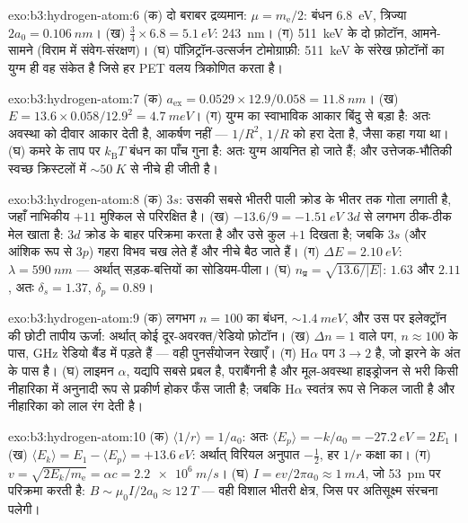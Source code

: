 \begin{solution}{exo:b3:hydrogen-atom:6}
(क) दो बराबर द्रव्यमान: $\mu = m_{\text{e}}/2$: बंधन
\qty{6.8}{eV}, त्रिज्या $2a_0 = \qty{0.106}{nm}$। (ख) $\tfrac34
\times 6.8 = \qty{5.1}{eV}$: \qty{243}{nm}। (ग) \qty{511}{keV} के दो
फ़ोटॉन, आमने-सामने (विराम में संवेग-संरक्षण)। (घ)
पॉज़िट्रॉन-उत्सर्जन टोमोग्राफ़ी: \qty{511}{keV} के संरेख फ़ोटॉनों का
युग्म ही वह संकेत है जिसे हर PET वलय त्रिकोणित करता है।
\end{solution}

\begin{solution}{exo:b3:hydrogen-atom:7}
(क) $a_{\text{ex}} = 0.0529 \times 12.9/0.058 = \qty{11.8}{nm}$।
(ख) $E = 13.6 \times 0.058/12.9^2 = \qty{4.7}{meV}$। (ग)
युग्म का स्वाभाविक आकार बिंदु से बड़ा है: अतः अवस्था को दीवार आकार
देती है, आकर्षण नहीं --- $1/R^2$, $1/R$ को हरा देता है, जैसा कहा गया था। (घ)
कमरे के ताप पर $k_{\text{B}}T$ बंधन का पाँच गुना है: अतः
युग्म आयनित हो जाते हैं; और उत्तेजक-भौतिकी स्वच्छ क्रिस्टलों में
$\sim\qty{50}{K}$ से नीचे ही जीती है।
\end{solution}

\begin{solution}{exo:b3:hydrogen-atom:8}
(क) $3s$: उसकी सबसे भीतरी पाली क्रोड के भीतर तक गोता लगाती है, जहाँ
नाभिकीय $+11$ मुश्किल से परिरक्षित है। (ख) $-13.6/9 = \qty{-1.51}{eV}$
$3d$ से लगभग ठीक-ठीक मेल खाता है: $3d$ क्रोड के बाहर परिक्रमा करता है
और उसे कुल $+1$ दिखता है; जबकि $3s$ (और आंशिक रूप से $3p$) गहरा विभव
चख लेते हैं और नीचे बैठ जाते हैं। (ग) $\Delta E = \qty{2.10}{eV}$: $\lambda = \qty{590}{nm}$
--- अर्थात् सड़क-बत्तियों का सोडियम-पीला। (घ) $n_{\text{प्र}} =
\sqrt{13.6/|E|}$: $1.63$ और $2.11$, अतः $\delta_s = 1.37$,
$\delta_p = 0.89$।
\end{solution}

\begin{solution}{exo:b3:hydrogen-atom:9}
(क) लगभग $n = 100$ का बंधन, $\sim\qty{1.4}{meV}$, और उस पर
इलेक्ट्रॉन की छोटी तापीय ऊर्जा: अर्थात् कोई दूर-अवरक्त/रेडियो फ़ोटॉन। (ख)
$\Delta n = 1$ वाले पग, $n \approx 100$ के पास, GHz रेडियो बैंड
में पड़ते हैं --- वही पुनर्संयोजन रेखाएँ। (ग) H$\alpha$ पग $3 \to
2$ है, जो झरने के अंत के पास है। (घ) लाइमन $\alpha$, यद्यपि सबसे प्रबल
है, पराबैंगनी है और मूल-अवस्था हाइड्रोजन से भरी किसी नीहारिका में
अनुनादी रूप से प्रकीर्ण होकर फँस जाती है; जबकि H$\alpha$ स्वतंत्र रूप
से निकल जाती है और नीहारिका को लाल रंग देती है।
\end{solution}

\begin{solution}{exo:b3:hydrogen-atom:10}
(क) $\langle 1/r\rangle = 1/a_0$: अतः $\langle E_p\rangle = -k/a_0 =
\qty{-27.2}{eV} = 2E_1$। (ख) $\langle E_k\rangle = E_1 - \langle
E_p\rangle = +\qty{13.6}{eV}$: अर्थात् विरियल अनुपात
$-\tfrac12$, हर $1/r$ कक्षा का। (ग) $v = \sqrt{2E_k/m_{\text{e}}} = \alpha c =
\qty{2.2e6}{m/s}$। (घ) $I = ev/2\pi a_0 \approx \qty{1}{mA}$,
जो \qty{53}{pm} पर परिक्रमा करती है: $B \sim \mu_0I/2a_0 \approx
\qty{12}{T}$ --- वही विशाल भीतरी क्षेत्र, जिस पर अतिसूक्ष्म संरचना
पलेगी।
\end{solution}

